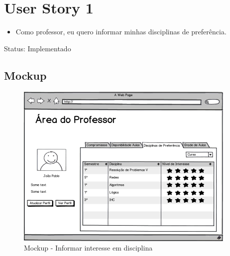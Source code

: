 \documentclass{abnt}
\begin{document}
	\clearpage
	\section{User Story 1}
	
		\begin{itemize}
			\item Como professor, eu quero informar minhas disciplinas de preferência.
		\end{itemize}
		
		Status: Implementado
		
		\subsection{Mockup}
		
		\begin{figure}[h]
					\begin{center}
						 \includegraphics[width=400px]{telaProfessorDisciplinas}
						 \caption{Mockup - Informar interesse em disciplina}
					\end{center}
				\end{figure}
		
\end{document}
